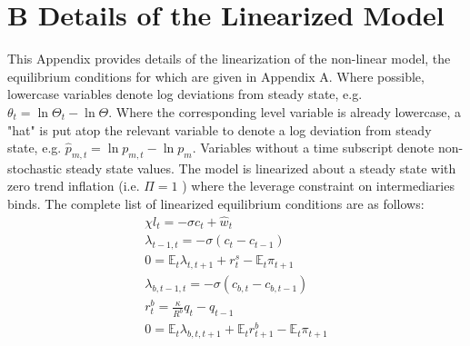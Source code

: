 \documentclass[10pt]{article}
\begin{document}
\section*{B Details of the Linearized Model}
This Appendix provides details of the linearization of the non-linear model, the equilibrium conditions for which are given in Appendix A. Where possible, lowercase variables denote log deviations from steady state, e.g. $\theta_{t}=\ln \Theta_{t}-\ln \Theta$. Where the corresponding level variable is already lowercase, a "hat" is put atop the relevant variable to denote a log deviation from steady state, e.g. $\widehat{p}_{m, t}=\ln p_{m, t}-\ln p_{m}$. Variables without a time subscript denote non-stochastic steady state values. The model is linearized about a steady state with zero trend inflation (i.e. $\Pi=1$ ) where the leverage constraint on intermediaries binds. The complete list of linearized equilibrium conditions are as follows:\\
\begin{gather*}
\chi l_{t}=-\sigma c_{t}+\widehat{w}_{t}  \tag{B.1}\\
\lambda_{t-1, t}=-\sigma\left(c_{t}-c_{t-1}\right)  \tag{B.2}\\
0=\mathbb{E}_{t} \lambda_{t, t+1}+r_{t}^{s}-\mathbb{E}_{t} \pi_{t+1}  \tag{B.3}\\
\lambda_{b, t-1, t}=-\sigma\left(c_{b, t}-c_{b, t-1}\right)  \tag{B.4}\\
r_{t}^{b}=\frac{\kappa}{R^{b}} q_{t}-q_{t-1}  \tag{B.5}\\
0=\mathbb{E}_{t} \lambda_{b, t, t+1}+\mathbb{E}_{t} r_{t+1}^{b}-\mathbb{E}_{t} \pi_{t+1} \tag{B.6}
\end{gather*}\\
\end{document}

